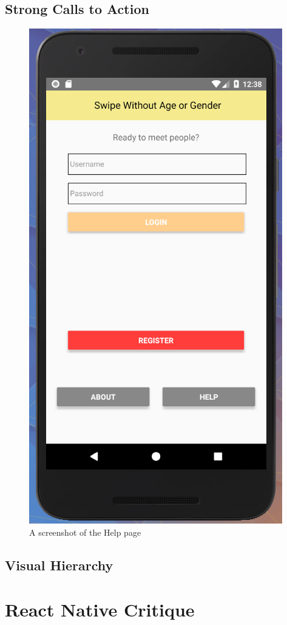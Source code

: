 \documentclass[a4paper, 11pt]{article}
\begin{document}
\subsection{Strong Calls to Action}

\begin{figure}
\centering
\includegraphics{home.png}
\caption{A screenshot of the Help page}
\end{figure}
\subsection{Visual Hierarchy}


\section{React Native Critique}
\end{document}
